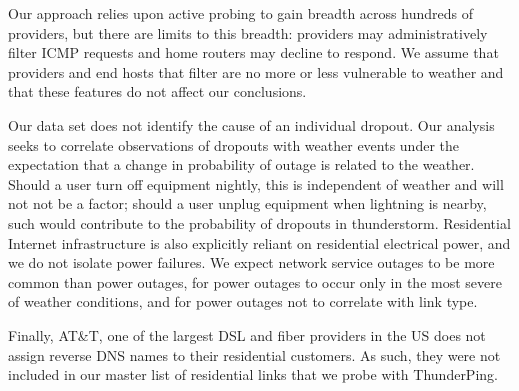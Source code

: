

Our approach relies upon active probing to gain breadth
across hundreds of providers, but there are limits to this
breadth: providers may administratively filter ICMP requests
and home routers may decline to respond.  We assume that
providers and end hosts that filter are no more or less
vulnerable to weather and that these features do not affect
our conclusions.

Our data set does not identify the cause of an individual
dropout. Our analysis seeks to correlate observations of
dropouts with weather events under the expectation that a
change in probability of outage is related to the weather.
Should a user turn off equipment nightly, this is
independent of weather and will not not be a factor; should a user
unplug equipment when lightning is nearby, such would
contribute to the probability of dropouts in thunderstorm.
Residential Internet infrastructure is also explicitly reliant
on residential electrical power, and we do not isolate power
failures.  We expect network service outages to be more common
than power outages, for power outages to occur only in the most
severe of weather conditions, and for power outages not
to correlate with link type.

Finally, AT\&T, one of the largest DSL and fiber providers in the US does
not assign reverse DNS names to their residential customers. As such, they
were not included in our master list of residential links that we probe
with ThunderPing.  
